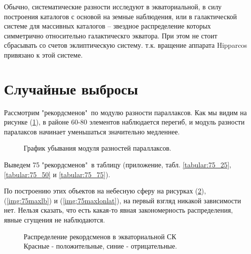 \documentclass[14pt]{article} %
\begin{document}
Обычно, систематические разности исследуют в экваториальной, в силу построения каталогов с основой на земные наблюдения, или в галактической системе для массивных каталогов -- звездное распределение которых симметрично относительно галактическго экватора. При этом не стоит сбрасывать со счетов эклиптическую систему. т.к. вращение аппарата Hipparcos привязано к этой системе.

\section{Случайные выбросы}\label{sub:smthrs}

Рассмотрим "рекордсменов"\ по модулю разности параллаксов.
Как мы видим на рисунке (\ref{img:abs_paralax}), в районе 60-80 элементов наблюдается перегиб, и модуль разности паралаксов начинает уменьшаться значительно медленнее.

\begin{figure}[h!]
\caption{График убывания модуля разностей параллаксов.}
\label{img:abs_paralax}
\end{figure}

Выведем 75 "рекордсменов"\ в таблицу (приложение, табл. \ref{tabular:75_25}, \ref{tabular:75_50} и \ref{tabular:75_75}).

По построению этих объектов на небесную сферу на рисурках (\ref{img:75maxradec}), (\ref{img:75maxlb}) и (\ref{img:75maxlonlat}), на первый взгляд никакой зависимости нет. Нельзя сказать, что есть какая-то явная  закономерность распределения, явные сгущения не наблюдаются.

\begin{figure}[h!]
\caption{Распределение рекордсменов в экваториальной СК\\Красные - положительные, синие - отрицательные.}
\label{img:75maxradec}
\end{figure}
\end{document}
